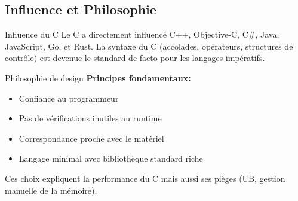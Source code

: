 \documentclass[11pt,a4paper]{article}
\begin{document}
\begin{center}
\end{center}

\subsection{Influence et Philosophie}

\begin{examplebox}{Influence du C}
Le C a directement influencé C++, Objective-C, C\#, Java, JavaScript, Go, et Rust. La syntaxe du C (accolades, opérateurs, structures de contrôle) est devenue le standard de facto pour les langages impératifs.
\end{examplebox}

\begin{techbox}{Philosophie de design}
\textbf{Principes fondamentaux:}
\begin{itemize}
\item Confiance au programmeur
\item Pas de vérifications inutiles au runtime
\item Correspondance proche avec le matériel
\item Langage minimal avec bibliothèque standard riche
\end{itemize}

Ces choix expliquent la performance du C mais aussi ses pièges (UB, gestion manuelle de la mémoire).
\end{techbox}
\end{document}
